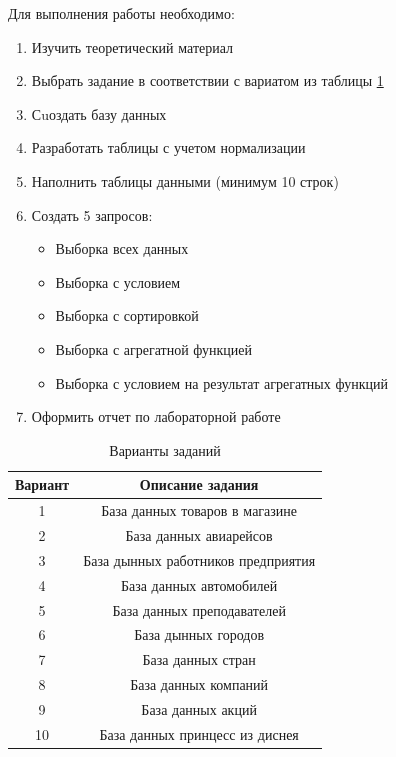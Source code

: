 \documentclass[a4paper]{article}
\begin{document}
Для выполнения работы необходимо:
\begin{enumerate}
  \item Изучить теоретический материал
  \item Выбрать задание в соответствии с вариатом из таблицы \ref{tab:tasks}
  \item Сuоздать базу данных
  \item Разработать таблицы с учетом нормализации
  \item Наполнить таблицы данными (минимум 10 строк)
   \item Создать 5 запросов:
    \begin{itemize}
      \item Выборка всех данных
      \item Выборка с условием
      \item Выборка с сортировкой
      \item Выборка с агрегатной функцией
      \item Выборка с условием на результат агрегатных функций
    \end{itemize}
  \item Оформить отчет по лабораторной работе
\end{enumerate}

\begin{table}[h]
      \caption{Варианты заданий}
      \begin{center}\label{tab:tasks}
      \begin{tabular}{|c|c|}
        \hline
        Вариант & Описание задания \\
        \hline
        1 & База данных товаров в магазине\\
        2 & База данных авиарейсов\\
        3 & База дынных работников предприятия\\
        4 & База данных автомобилей\\
        5 & База данных преподавателей\\
        6 & База дынных городов\\
        7 & База данных стран\\
        8 & База данных компаний\\
        9 & База данных акций\\
        10 & База данных принцесс из диснея \\
        \hline
      \end{tabular}
    \end{center}
\end{table}
\end{document}
